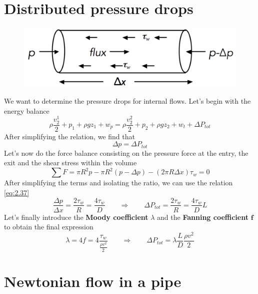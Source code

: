 \section{Distributed pressure drops}
	\begin{figure}
	\vspace{-5mm}
	\includegraphics[scale=0.2]{ch2/5}
	\end{figure}
	We want to determine the pressure drops for internal flows. Let's begin with the energy balance 
	\begin{equation}
			\rho \frac{v_2^1}{2} + p_1 + \rho gz_1 + w_p = \rho \frac{v_2^2}{2} + p_2 + \rho gz_2+w_t + \Delta P_{tot}
	\end{equation}
	After simplifying the relation, we find that 
	\begin{equation}
		\Delta p = \Delta P_{tot} 
		\label{eq:2.37}
	\end{equation}
	Let's now do the force balance consisting on the pressure force at the entry, the exit and the shear stress within the volume
	\begin{equation}
		\sum F = \pi R^2 p - \pi R^2 (p-\Delta p) - (2\pi R \Delta x)\tau _{w} = 0 
	\end{equation}
	After simplifying the terms and isolating the ratio, we can use the relation \autoref{eq:2.37}
	\begin{equation}
		\frac{\Delta p}{\Delta x} = \frac{2\tau _w}{R} = \frac{4 \tau _w}{D} \qquad \Rightarrow \qquad \Delta P_{tot} = \frac{2\tau _w}{R} = \frac{4 \tau _w}{D} L
	\end{equation}
	Let's finally introduce the \textbf{Moody coefficient} $\lambda$ and the \textbf{Fanning coefficient} $\mathbf{f}$ to obtain the final expression 
	\begin{equation}
		\lambda = 4f = 4\frac{\tau _w}{\frac{\rho v^2}{2}} \qquad \Rightarrow  \qquad \Delta P_{tot} = \lambda\frac{L}{D}\frac{\rho v^2}{2}
	\end{equation}

\section{Newtonian flow in a pipe}

